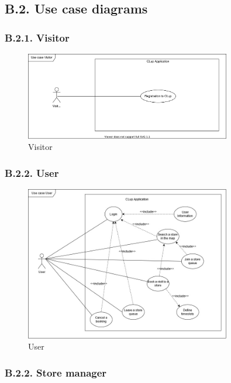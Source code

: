 \subsection{B.2. Use case diagrams}

\subsubsection{B.2.1. Visitor}

\begin{figure}[H]
\centering
\includegraphics[width=0.8\textwidth]{use_cases/use_case_visitor_registration}
\caption{Visitor}
\end{figure}

\subsubsection{B.2.2. User}

\begin{figure}[H]
\centering
\includegraphics[width=0.8\textwidth]{use_cases/use_case_user}
\caption{User}
\end{figure}

\subsubsection{B.2.2. Store manager}

